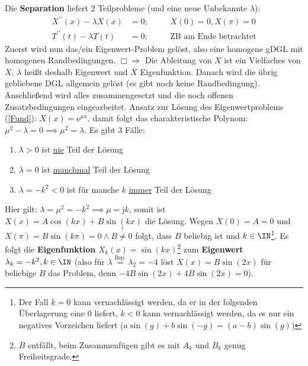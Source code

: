    Die \textbf{Separation} liefert {\color{gray}2} Teilprobleme (und eine neue Unbekannte {\color{gray}$\lambda$}):
   {\color{gray}\begin{align}
   		\boxed{X^{\prime\prime}(x)-\lambda X(x)}&=0;\quad&&X(0)=0,X(\pi)=0\nonumber\\
   		T^{\prime\prime}(t)-\lambda T(t)&=0;\quad&&\text{ZB am Ende betrachtet} \nonumber
   	\end{align}}
   Zuerst wird nun das/ein Eigenwert-Problem gelöst, also eine homogene gDGL mit homogenen Randbedingungen. {\color{gray} $\Box\Rightarrow$ Die Ableitung von $X$ ist ein Vielfaches von $X$, $\lambda$ heißt deshalb Eigenwert und $X$ Eigenfunktion.} Danach wird die übrig gebliebene DGL allgemein gelöst (es gibt noch keine Randbedingung). Anschließend wird alles zusammengesetzt und die noch offenen Zusatzbedingungen eingearbeitet. {\color{gray} Ansatz zur Lösung des Eigenwertproblems (\nearrow\ref{Fund}): $X(x)=\mathrm{e}^{\mu x}$, damit folgt das charakteristische Polynom: $\mu^2-\lambda=0\implies \mu^2=\lambda$.} Es gibt 3 Fälle:
   \begin{enumerate}
   	\item $\lambda>0$ ist \underline{nie} Teil der Lösung
   	\item $\lambda=0$ ist \underline{manchmal} Teil der Lösung
   	\item $\lambda=-k^2<0$ ist für manche $k$ \underline{immer} Teil der Lösung
   \end{enumerate} 
    {\color{gray} Hier gilt: $\lambda=\mu^2=-k^2\implies \mu=\mathrm{j}k$, somit ist $X(x)=A\cos(kx)+B\sin(kx)$ die Lösung. Wegen $X(0)=A=0$ und $X(\pi)=B\sin(k\pi)=0\land B\stackrel{!}{\neq}0$ folgt, dass $B$ beliebig ist und $k\in \IN$\footnote{Der Fall $k=0$ kann vernachlässigt werden, da er in der folgenden Überlagerung eine 0 liefert, $k<0$ kann vernachlässigt werden, da es nur ein negatives Vorzeichen liefert ($a\sin(g)+b\sin(-g)=(a-b)\sin(g)$)}. Es folgt die \textbf{Eigenfunktion} $X_k(x)=\sin(kx)$\footnote{$B$ entfällt, beim Zusammenfügen gibt es mit $A_k$ und $B_k$ genug Freiheitsgrade.} zum \textbf{Eigenwert} $\lambda_k=-k^2, k\in \IN$ (also für $\lambda\stackrel{\text{Bsp.}}{=}\lambda_2{=}-4$ löst $X(x)=B\sin(2x)$ für beliebige $B$ das Problem, denn $-4B\sin(2x)+4B\sin(2x)=0$).} \\
